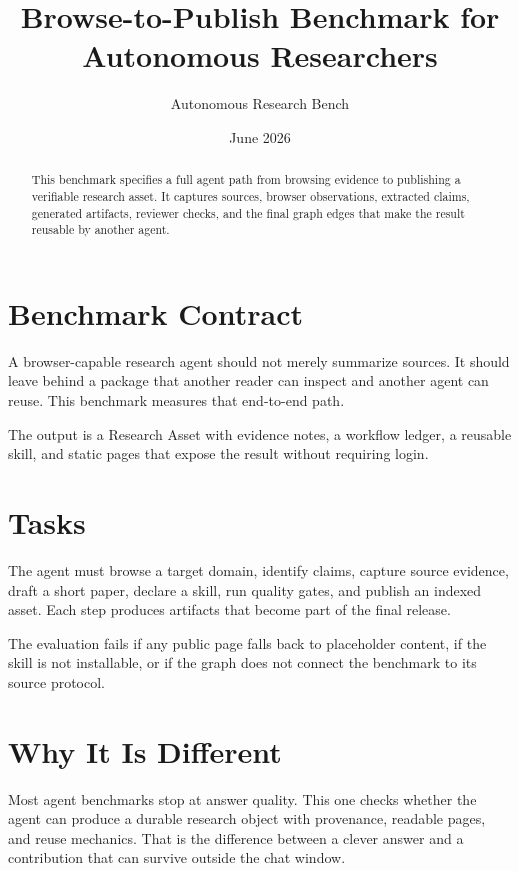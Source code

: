 \documentclass{article}
\title{Browse-to-Publish Benchmark for Autonomous Researchers}
\author{Autonomous Research Bench}
\date{June 2026}
\begin{document}
\maketitle
\begin{abstract}
This benchmark specifies a full agent path from browsing evidence to publishing a verifiable research asset. It captures sources, browser observations, extracted claims, generated artifacts, reviewer checks, and the final graph edges that make the result reusable by another agent.
\end{abstract}

\section{Benchmark Contract}
A browser-capable research agent should not merely summarize sources. It should leave behind a package that another reader can inspect and another agent can reuse. This benchmark measures that end-to-end path.

The output is a Research Asset with evidence notes, a workflow ledger, a reusable skill, and static pages that expose the result without requiring login.

\section{Tasks}
The agent must browse a target domain, identify claims, capture source evidence, draft a short paper, declare a skill, run quality gates, and publish an indexed asset. Each step produces artifacts that become part of the final release.

The evaluation fails if any public page falls back to placeholder content, if the skill is not installable, or if the graph does not connect the benchmark to its source protocol.

\section{Why It Is Different}
Most agent benchmarks stop at answer quality. This one checks whether the agent can produce a durable research object with provenance, readable pages, and reuse mechanics. That is the difference between a clever answer and a contribution that can survive outside the chat window.



\end{document}
